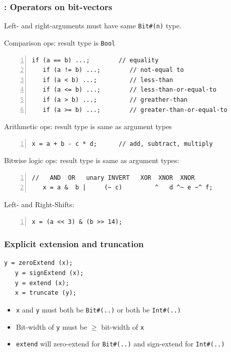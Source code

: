 
\begin{frame}[fragile]
\frametitle{{\BSV}: Operators on bit-vectors}

\footnotesize

Left- and right-arguments must have same \verb|Bit#(n)| type.

\vspace{1ex}

Comparison ops: result type is {\tt Bool}
\begin{Verbatim}[frame=single, numbers=left]
   if (a == b) ...;        // equality
   if (a != b) ...;        // not-equal to
   if (a < b) ...;         // less-than
   if (a <= b) ...;        // less-than-or-equal-to
   if (a > b) ...;         // greather-than
   if (a >= b) ...;        // greater-than-or-equal-to
\end{Verbatim}

Arithmetic ops: result type is same as argument types
\begin{Verbatim}[frame=single, numbers=left]
   x = a + b - c * d;      // add, subtract, multiply
\end{Verbatim}

Bitwise logic ops: result type is same as argument types:
\begin{Verbatim}[frame=single, numbers=left]
   //   AND  OR   unary INVERT   XOR  XNOR  XNOR
   x = a &  b |     (~ c)         ^   d ^~ e ~^ f;
\end{Verbatim}

Left- and Right-Shifts:
\begin{Verbatim}[frame=single, numbers=left]
   x = (a << 3) & (b >> 14);
\end{Verbatim}

\end{frame}


\begin{frame}[fragile]
\frametitle{Explicit extension and truncation}

\footnotesize

\begin{Verbatim}[frame=single]
   y = zeroExtend (x);
   y = signExtend (x);
   y = extend (x);
   x = truncate (y);
\end{Verbatim}

\vspace{2ex}

\begin{itemize}
 \item {\tt x} and {\tt y} must both be \verb|Bit#(..)| or both be \verb|Int#(..)|

 \item Bit-width of {\tt y} must be $\geq$ bit-width of {\tt x}

 \item \verb|extend| will zero-extend for \verb|Bit#(..)| and sign-extend for \verb|Int#(..)|
\end{itemize}

\end{frame}

